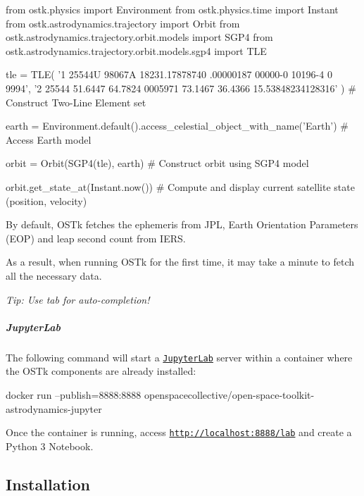 \begin{DoxyCode}
\textcolor{keyword}{from} ostk.physics \textcolor{keyword}{import} Environment
\textcolor{keyword}{from} ostk.physics.time \textcolor{keyword}{import} Instant
\textcolor{keyword}{from} ostk.astrodynamics.trajectory \textcolor{keyword}{import} Orbit
\textcolor{keyword}{from} ostk.astrodynamics.trajectory.orbit.models \textcolor{keyword}{import} SGP4
\textcolor{keyword}{from} ostk.astrodynamics.trajectory.orbit.models.sgp4 \textcolor{keyword}{import} TLE

tle = TLE(
    \textcolor{stringliteral}{'1 25544U 98067A   18231.17878740  .00000187  00000-0  10196-4 0  9994'},
    \textcolor{stringliteral}{'2 25544  51.6447  64.7824 0005971  73.1467  36.4366 15.53848234128316'}
)  \textcolor{comment}{# Construct Two-Line Element set}

earth = Environment.default().access\_celestial\_object\_with\_name(\textcolor{stringliteral}{'Earth'})  \textcolor{comment}{# Access Earth model}

orbit = Orbit(SGP4(tle), earth)  \textcolor{comment}{# Construct orbit using SGP4 model}

orbit.get\_state\_at(Instant.now())  \textcolor{comment}{# Compute and display current satellite state (position, velocity)}
\end{DoxyCode}


By default, O\+S\+Tk fetches the ephemeris from J\+PL, Earth Orientation Parameters (E\+OP) and leap second count from I\+E\+RS.

As a result, when running O\+S\+Tk for the first time, it may take a minute to fetch all the necessary data.

{\itshape Tip\+: Use tab for auto-\/completion!}

\subparagraph*{Jupyter\+Lab}

The following command will start a \href{https://jupyterlab.readthedocs.io/en/stable/}{\tt Jupyter\+Lab} server within a container where the O\+S\+Tk components are already installed\+:


\begin{DoxyCode}
docker run --publish=8888:8888 openspacecollective/open-space-toolkit-astrodynamics-jupyter
\end{DoxyCode}


Once the container is running, access \href{http://localhost:8888/lab}{\tt http\+://localhost\+:8888/lab} and create a Python 3 Notebook.

\subsection*{Installation}

